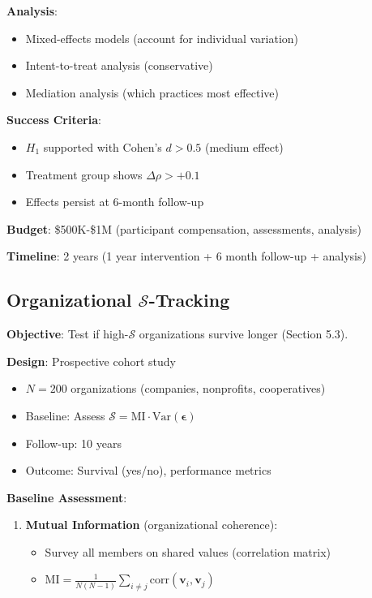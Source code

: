 \documentclass[11pt,a4paper]{article}
\theoremstyle{definition}
\theoremstyle{remark}
\begin{document}
\begin{small}
\begin{enumerate}
\begin{protocol}
\textbf{Analysis}:
\begin{itemize}
    \item Mixed-effects models (account for individual variation)
    \item Intent-to-treat analysis (conservative)
    \item Mediation analysis (which practices most effective)
\end{itemize}

\textbf{Success Criteria}:
\begin{itemize}
    \item \(H_1\) supported with Cohen's \(d > 0.5\) (medium effect)
    \item Treatment group shows \(\Delta\rho > +0.1\)
    \item Effects persist at 6-month follow-up
\end{itemize}

\textbf{Budget}: \$500K-\$1M (participant compensation, assessments, analysis)

\textbf{Timeline}: 2 years (1 year intervention + 6 month follow-up + analysis)
\end{protocol}

\subsection{Organizational \(\mathcal{S}\)-Tracking}

\begin{protocol}
\textbf{Objective}: Test if high-\(\mathcal{S}\) organizations survive longer (Section 5.3).

\textbf{Design}: Prospective cohort study
\begin{itemize}
    \item \(N = 200\) organizations (companies, nonprofits, cooperatives)
    \item Baseline: Assess \(\mathcal{S} = \text{MI} \cdot \text{Var}(\boldsymbol{\epsilon})\)
    \item Follow-up: 10 years
    \item Outcome: Survival (yes/no), performance metrics
\end{itemize}

\textbf{Baseline Assessment}:
\begin{enumerate}
    \item \textbf{Mutual Information} (organizational coherence):
        \begin{itemize}
            \item Survey all members on shared values (correlation matrix)
            \item \(\text{MI} = \frac{1}{N(N-1)}\sum_{i \neq j} \text{corr}(\mathbf{v}_i, \mathbf{v}_j)\)
        \end{itemize}
    

\end{enumerate}
\end{protocol}
\end{enumerate}
\end{small}
\end{document}
